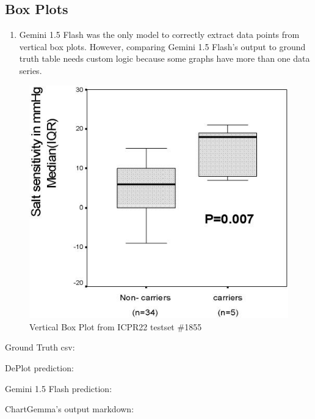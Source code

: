 \documentclass[
	letterpaper, %
]{jdf}
\begin{document}
\subsection{Box Plots}\label{par:box}
\begin{enumerate}
         \item Gemini 1.5 Flash was the only model to correctly extract data points from vertical box plots.
             However, comparing Gemini 1.5 Flash's output to ground truth table needs custom logic because some graphs have more than one data series.
              \end{enumerate}
              \begin{figure}
                   \includegraphics{test-sample/icpr22/images/vertical-box/PMC1855992___g001.jpg}
                   \caption{Vertical Box Plot from ICPR22 testset \#1855}
                   \label{fig:icpr22-box-185}
                    \end{figure}
               Ground Truth csv:
               
               DePlot prediction:
               
               Gemini 1.5 Flash prediction:
               
               ChartGemma's  output markdown:
               
\end{document}
